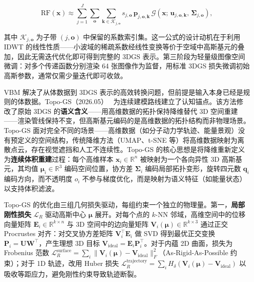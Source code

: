 \begin{equation}
  \mathrm{RF}(\mathbf{x}) \approx \sum_{j=1}^{J} \sum_{\mathbf{o}} \sum_{\mathbf{k} \in \mathcal{K}_{j,\mathbf{o}}} s_{j,\mathbf{o}} \, \mathbf{p}_{j,\mathbf{o},\mathbf{k}} \, \mathcal{G}(\mathbf{x};\, \mathbf{u}_{j,\mathbf{o},\mathbf{k}},\, \boldsymbol{\Sigma}_{j,\mathbf{o}}),
\end{equation}

其中 $\mathcal{K}_{j,\mathbf{o}}$ 为子带 $(j,\mathbf{o})$ 中保留的系数索引集。这一公式的设计动机在于利用 IDWT 的线性性质——小波域的稀疏系数经线性变换等价于空域中高斯基元的叠加，因此无需迭代优化即可得到完整的 3DGS 表示。第三阶段为轻量级图像空间微调：对多个传递函数分别渲染 64 张图像作为监督，用标准 3DGS 损失微调初始高斯参数，通常仅需少量迭代即可收敛。

VBM 解决了从体数据到 3DGS 表示的高效转换问题，但前提是输入本身已经是规则的体数据。Topo-GS（2026.05）~\cite{2605_17011} 为连续建模路线建立了认知锚点。该方法修改了原始 3DGS 的\textbf{语义含义}——用高维数据的拓扑保持降维替代 3D 空间重建——渲染管线保持不变，但高斯基元编码的是高维数据的拓扑结构而非物理场景。Topo-GS 面对完全不同的场景——高维数据（如分子动力学轨迹、能量景观）没有预定义的空间结构，传统降维方法（UMAP、t-SNE 等）将高维数据映射为离散点云，存在视觉遮挡和人工不连续性。Topo-GS 的核心思想是将降维重新定义为\textbf{连续体积重建}过程：每个高维样本 $\mathbf{x}_i \in \mathbb{R}^n$ 被映射为一个各向异性 3D 高斯基元，其均值 $\boldsymbol{\mu}_i \in \mathbb{R}^3$ 编码空间位置，协方差 $\boldsymbol{\Sigma}_i$ 编码局部拓扑变形，旋转四元数 $\mathbf{q}_i$ 编码方向，而不透明度 $o_i$ 不参与梯度优化，而是映射为语义特征（如能量状态）以支持体积滤波。

Topo-GS 的优化由三组几何损失驱动，每组约束一个独立的物理量。第一，\textbf{局部刚性损失} $\mathcal{L}_R$ 驱动高斯中心 $\boldsymbol{\mu}$ 展开。对每个点的 $k$-NN 邻域，高维空间中的位移向量矩阵 $\mathbf{E}_i \in \mathbb{R}^{k \times n}$ 与 3D 空间中的边向量矩阵 $\mathbf{V}_i(\boldsymbol{\mu}) \in \mathbb{R}^{k \times 3}$ 通过正交 Procrustes 对齐：对交叉协方差矩阵 $\mathbf{V}_i^\top \mathbf{E}_i$ 做 SVD 得到最优正交变换 $\mathbf{P}_i = \mathbf{U}\mathbf{W}^\top$，产生理想 3D 目标 $\mathbf{V}_{\mathrm{ideal}} = \mathbf{E}_i \mathbf{P}_i^\top$。对于内蕴 2D 曲面，损失为 Frobenius 范数 $\mathcal{L}_R^{\mathrm{surface}} = \sum_i \|\mathbf{V}_i(\boldsymbol{\mu}) - \mathbf{V}_{\mathrm{ideal}}\|_F^2$（As-Rigid-As-Possible 约束）；对于 1D 轨迹，改用 Huber 损失 $\mathcal{L}_R^{\mathrm{trajectory}} = \sum_i H_\delta(\mathbf{V}_i(\boldsymbol{\mu}) - \mathbf{V}_{\mathrm{ideal}})$ 以吸收等距应力，避免刚性约束导致轨迹断裂。

